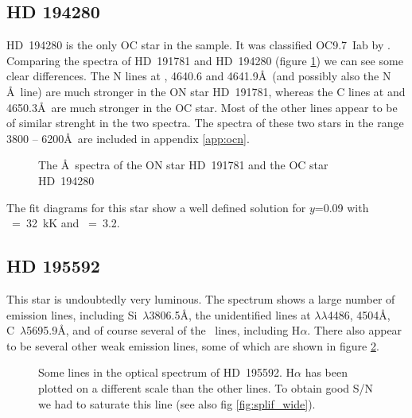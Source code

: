 \subsection{HD 194280}  %
\label{analysis:hd194280}
HD~194280 is the only OC star in the sample. It was classified
OC9.7~Iab by . Comparing the spectra of HD~191781 and
HD~194280 (figure \ref{fig:on_oc}) we can see some clear differences.
The N lines at \lam{}, 4640.6 and 4641.9\AA\ (and
possibly also the N \AA\ line) are much stronger in
the ON star HD~191781, whereas the C lines at \lam{}
and 4650.3\AA\ are much stronger in the OC star. Most of the other
lines appear to be of similar strenght in the two spectra. The spectra
of these two stars in the range 3800 -- 6200\AA\ are included in
appendix \ref{app:ocn}.

\begin{figure}
\epsfxsize=15cm
\caption[The spectra of the ON star HD~191781 and the OC star
HD~194280]{\fcfont The \AA\ spectra of the ON star HD~191781 and the OC
star HD~194280}
\label{fig:on_oc}
\end{figure}

The fit diagrams for this star show a well defined solution for $y$=0.09 with
\teff~=~32~kK and \logg~=~3.2.


\subsection{HD 195592}  %
\label{analysis:hd195592}
This star is undoubtedly  very luminous. The spectrum shows a
large number of emission lines, including
Si~$\lambda$3806.5\AA, the unidentified lines at
$\lambda\lambda$4486, 4504\AA, C~$\lambda$5695.9\AA, and of
course several of the \hi\ lines, including H$\alpha$. There also
appear to be several other weak emission lines, some of which are
shown in figure \ref{fig:hd195592_emission}.

\begin{figure} %
\epsfxsize=15cm
\caption[Emission lines in HD~195592]
{\fcfont Some lines in the optical spectrum of HD~195592. H$\alpha$ has been
plotted on a different scale than the other lines. To obtain good S/N
we had to saturate this line (see also fig \ref{fig:splif_wide}).}
\label{fig:hd195592_emission}
\end{figure} %


